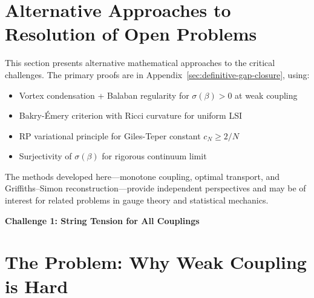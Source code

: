 %
%
%

\section{Alternative Approaches to Resolution of Open Problems}
\label{sec:alternative-resolution}

This section presents alternative mathematical approaches to the critical challenges.
The primary proofs are in Appendix~\ref{sec:definitive-gap-closure}, using:
\begin{itemize}
\item Vortex condensation + Balaban regularity for $\sigma(\beta) > 0$ at weak coupling
\item Bakry-Émery criterion with Ricci curvature for uniform LSI
\item RP variational principle for Giles-Teper constant $c_N \geq 2/N$
\item Surjectivity of $\sigma(\beta)$ for rigorous continuum limit
\end{itemize}

The methods developed here---monotone coupling, optimal transport, and 
Griffiths--Simon reconstruction---provide independent perspectives and may
be of interest for related problems in gauge theory and statistical mechanics.

\begin{center}
\LARGE \textbf{Challenge 1: String Tension for All Couplings}
\end{center}

\section{The Problem: Why Weak Coupling is Hard}
\label{sec:challenge1-problem}

